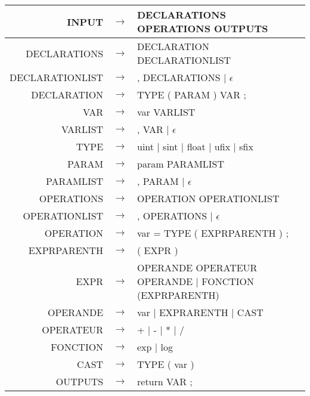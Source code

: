 \documentclass{article}
\begin{document}
\begin{tabular}{rll}
\noindent INPUT & $\rightarrow$ & DECLARATIONS OPERATIONS OUTPUTS\\
\hline
DECLARATIONS & $\rightarrow$ & DECLARATION DECLARATIONLIST\\
DECLARATIONLIST & $\rightarrow$ & , DECLARATIONS | $\epsilon$\\
DECLARATION & $\rightarrow$ & TYPE ( PARAM ) VAR ;\\
VAR & $\rightarrow$ & var VARLIST\\
VARLIST & $\rightarrow$ & , VAR | $\epsilon$\\
TYPE & $\rightarrow$ & uint | sint | float | ufix | sfix\\
PARAM & $\rightarrow$ & param PARAMLIST\\
PARAMLIST & $\rightarrow$ & , PARAM | $\epsilon$\\
\hline
OPERATIONS & $\rightarrow$ & OPERATION OPERATIONLIST\\
OPERATIONLIST & $\rightarrow$ & , OPERATIONS | $\epsilon$\\
OPERATION & $\rightarrow$ & var = TYPE ( EXPRPARENTH ) ;\\
EXPRPARENTH & $\rightarrow$ & ( EXPR )\\
EXPR & $\rightarrow$ & OPERANDE OPERATEUR OPERANDE | FONCTION (EXPRPARENTH)\\
OPERANDE & $\rightarrow$ & var | EXPRARENTH | CAST\\
OPERATEUR & $\rightarrow$ & + | - | * | /\\
FONCTION & $\rightarrow$ & exp | log\\
CAST & $\rightarrow$ & TYPE ( var )\\
\hline
OUTPUTS & $\rightarrow$ & return VAR ;\\
\end{tabular}
\end{document}
